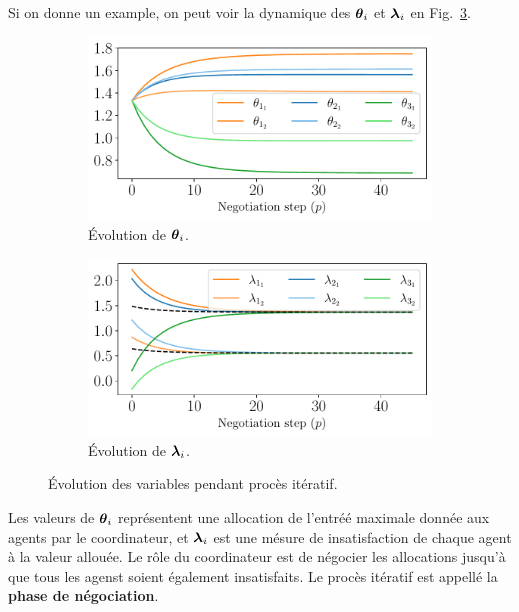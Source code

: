 \documentclass[../main.tex]{subfiles}
\begin{document}
Si on donne un example, on peut voir la dynamique des $\boldsymbol{\theta}_{i}$ et $\boldsymbol{\lambda}_{i}$ en Fig.~\ref{fig:example_variables_fr}.
\begin{figure}[h]
  \centering
  \begin{subfigure}{0.45\textwidth}
    \includegraphics[width=\textwidth]{../img/example_primal_decomposition/example_theta.pdf}
    \caption{Évolution de $\boldsymbol{\theta}_{i}$.}\label{fig:example_theta_fr}
  \end{subfigure}
  \hfill
  \begin{subfigure}{0.45\textwidth}
    \centering
    \includegraphics[width=\textwidth]{../img/example_primal_decomposition/example_lambda.pdf}
    \caption{Évolution de $\boldsymbol{\lambda}_{i}$.}\label{fig:example_lambda_fr}
  \end{subfigure}
    \caption{Évolution des variables pendant procès itératif.}\label{fig:example_variables_fr}
\end{figure}

Les valeurs de $\boldsymbol{\theta}_{i}$ représentent une allocation de l'entréé maximale donnée aux agents par le coordinateur, et $\boldsymbol{\lambda}_{i}$ est une mésure de insatisfaction de chaque agent à la valeur allouée.
Le rôle du coordinateur est de négocier les allocations jusqu'à que tous les agenst soient également insatisfaits.
Le procès itératif est appellé la \textbf{phase de négociation}.
\end{document}
